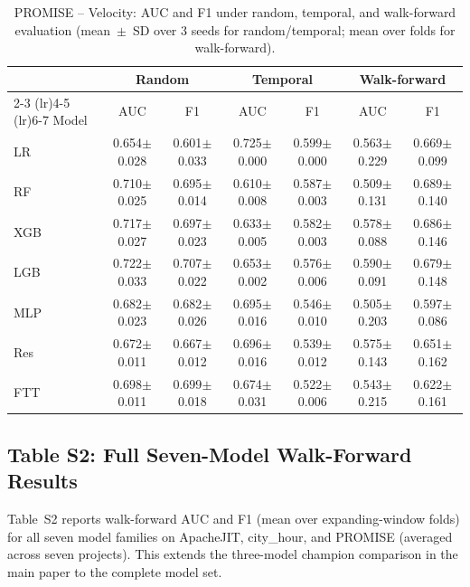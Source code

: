 \begin{table}[htbp]
\centering
\caption{PROMISE -- Velocity: AUC and F1 under random, temporal, and walk-forward evaluation (mean~$\pm$~SD over 3 seeds for random/temporal; mean over folds for walk-forward).}
\label{tab:supp-velocity}
\scriptsize
\begin{tabular}{l cc cc cc}
\toprule
 & \multicolumn{2}{c}{Random} & \multicolumn{2}{c}{Temporal} & \multicolumn{2}{c}{Walk-forward} \\
\cmidrule(lr){2-3} \cmidrule(lr){4-5} \cmidrule(lr){6-7}
Model & AUC & F1 & AUC & F1 & AUC & F1 \\
\midrule
LR & 0.654$\pm$0.028 & 0.601$\pm$0.033 & 0.725$\pm$0.000 & 0.599$\pm$0.000 & 0.563$\pm$0.229 & 0.669$\pm$0.099 \\
RF & 0.710$\pm$0.025 & 0.695$\pm$0.014 & 0.610$\pm$0.008 & 0.587$\pm$0.003 & 0.509$\pm$0.131 & 0.689$\pm$0.140 \\
XGB & 0.717$\pm$0.027 & 0.697$\pm$0.023 & 0.633$\pm$0.005 & 0.582$\pm$0.003 & 0.578$\pm$0.088 & 0.686$\pm$0.146 \\
LGB & 0.722$\pm$0.033 & 0.707$\pm$0.022 & 0.653$\pm$0.002 & 0.576$\pm$0.006 & 0.590$\pm$0.091 & 0.679$\pm$0.148 \\
MLP & 0.682$\pm$0.023 & 0.682$\pm$0.026 & 0.695$\pm$0.016 & 0.546$\pm$0.010 & 0.505$\pm$0.203 & 0.597$\pm$0.086 \\
Res & 0.672$\pm$0.011 & 0.667$\pm$0.012 & 0.696$\pm$0.016 & 0.539$\pm$0.012 & 0.575$\pm$0.143 & 0.651$\pm$0.162 \\
FTT & 0.698$\pm$0.011 & 0.699$\pm$0.018 & 0.674$\pm$0.031 & 0.522$\pm$0.006 & 0.543$\pm$0.215 & 0.622$\pm$0.161 \\
\bottomrule
\end{tabular}
\end{table}

\subsection*{Table S2: Full Seven-Model Walk-Forward Results}

Table~S2 reports walk-forward AUC and F1 (mean over expanding-window folds)
for all seven model families on ApacheJIT, city\_hour, and PROMISE (averaged
across seven projects). This extends the three-model champion comparison in the
main paper to the complete model set.

